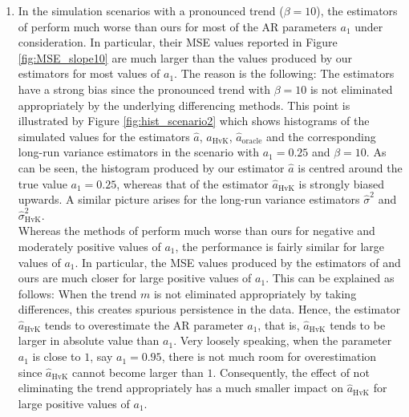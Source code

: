 \begin{enumerate}[label=(\roman*),leftmargin=0.9cm]
\item In the simulation scenarios with a pronounced trend ($\beta = 10$), the estimators of \cite{Hall2003} perform much worse than ours for most of the AR parameters $a_1$ under consideration. In particular, their MSE values reported in Figure \ref{fig:MSE_slope10} are much larger than the values produced by our estimators for most values of $a_1$. The reason is the following: The estimators have a strong bias since the pronounced trend with $\beta = 10$ is not eliminated appropriately by the underlying differencing methods. This point is illustrated by Figure \ref{fig:hist_scenario2} which shows histograms of the simulated values for the estimators $\widehat{a}$, $\widehat{a}_{\text{HvK}}$, $\widehat{a}_{\text{oracle}}$ and the corresponding long-run variance estimators in the scenario with $a_1=0.25$ and $\beta = 10$. As can be seen, the histogram produced by our estimator $\widehat{a}$ is centred around the true value $a_1 = 0.25$, whereas that of the estimator $\widehat{a}_{\text{HvK}}$ is strongly biased upwards. A similar picture arises for the long-run variance estimators $\widehat{\sigma}^2$ and $\widehat{\sigma}^2_{\text{HvK}}$. \\
Whereas the methods of \cite{Hall2003} perform much worse than ours for negative and moderately positive values of $a_1$, the performance is fairly similar for large values of $a_1$. In particular, the MSE values produced by the estimators of \cite{Hall2003} and ours are much closer for large positive values of $a_1$. This can be explained as follows: When the trend $m$ is not eliminated appropriately by taking differences, this creates spurious persistence in the data. Hence, the estimator $\widehat{a}_{\text{HvK}}$ tends to overestimate the AR parameter $a_1$, that is, $\widehat{a}_{\text{HvK}}$ tends to be larger in absolute value than $a_1$. Very loosely speaking, when the parameter $a_1$ is close to $1$, say $a_1 = 0.95$, there is not much room for overestimation since $\widehat{a}_{\text{HvK}}$ cannot become larger than $1$. Consequently, the effect of not eliminating the trend appropriately has a much smaller impact on $\widehat{a}_{\text{HvK}}$ for large positive values of $a_1$. 


\end{enumerate}



